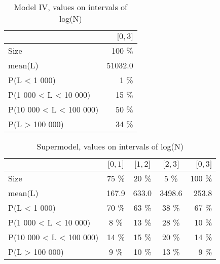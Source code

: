 \documentclass[numbered]{CSL}
\begin{document}
\setlength{\tabcolsep}{0.5em}
\begin{table}
\centering
\caption{Model IV, values on intervals of log(N) \label{table:NModelIV}}
\begin{tabular}{l||r}
\toprule
{} & \small{$\lbrack 0, 3 \rbrack$} \\
\midrule
Size                    &              100 \% \\
mean(L)                 &            51032.0 \\
P(L < 1 000)            &                1 \% \\
P(1 000 < L < 10 000)   &               15 \% \\
P(10 000 < L < 100 000) &               50 \% \\
P(L > 100 000)          &               34 \% \\
\bottomrule
\end{tabular}
\end{table}

\setlength{\tabcolsep}{0.5em}
\begin{table}
\centering
\caption{Supermodel, values on intervals of log(N) \label{table:NSupermodel}}
\begin{tabular}{l|ccc|r}
\toprule
{} & \small{$\lbrack 0, 1 \rbrack$} & \small{$\lbrack 1, 2 \rbrack$} & \small{$\lbrack 2, 3 \rbrack$} & \small{$\lbrack 0, 3 \rbrack$} \\
\midrule
Size                    &               75 \% &               20 \% &                5 \% &              100 \% \\
mean(L)                 &              167.9 &              633.0 &             3498.6 &              253.8 \\
P(L < 1 000)            &               70 \% &               63 \% &               38 \% &               67 \% \\
P(1 000 < L < 10 000)   &                8 \% &               13 \% &               28 \% &               10 \% \\
P(10 000 < L < 100 000) &               14 \% &               15 \% &               20 \% &               14 \% \\
P(L > 100 000)          &                9 \% &               10 \% &               13 \% &                9 \% \\
\bottomrule
\end{tabular}
\end{table}
\end{document}
